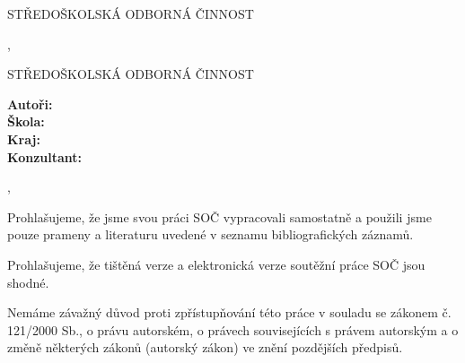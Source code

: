 \begin{titlepage}
  \bfseries{
    \begin{center}
      \LARGE{STŘEDOŠKOLSKÁ ODBORNÁ ČINNOST}

      \vspace{14pt}
      \large{
        \specialization
      }

      \vspace{0.4 \textheight}

      \LARGE{
        \mainTitle
      }
      \vspace{0.3 \textheight}
    \end{center}

    \noindent\Large{\authorName}

    \noindent\Large{\district {} \city, \publicationYear}
  }
\end{titlepage}

{\bfseries
\begin{center}
  \LARGE{STŘEDOŠKOLSKÁ ODBORNÁ ČINNOST}

  \vspace{14pt}
  {\large
    \specialization
  }

  \vspace{0.3 \textheight}

  \LARGE{
    \mainTitle
  }

  \LARGE{
    \mainTitleEN
  }

  \vspace{0.2\textheight}
\end{center}
}
{\Large
\noindent\textbf{Autoři:} \authorName\\
\textbf{Škola:} \school\\
\textbf{Kraj:} \district\\
\textbf{Konzultant: } \consultant\\
}

\noindent \city, \publicationYear

\cleardoublepage


\noindent Prohlašujeme, že jsme svou práci SOČ vypracovali samostatně a použili jsme pouze prameny a literaturu uvedené v seznamu bibliografických záznamů.

\noindent Prohlašujeme, že tištěná verze a elektronická verze soutěžní práce SOČ jsou shodné.

\noindent Nemáme závažný důvod proti zpřístupňování této práce v souladu se zákonem č. 121/2000 Sb., o právu autorském, o právech souvisejících s právem autorským a o změně některých zákonů (autorský zákon) ve znění pozdějších předpisů.

